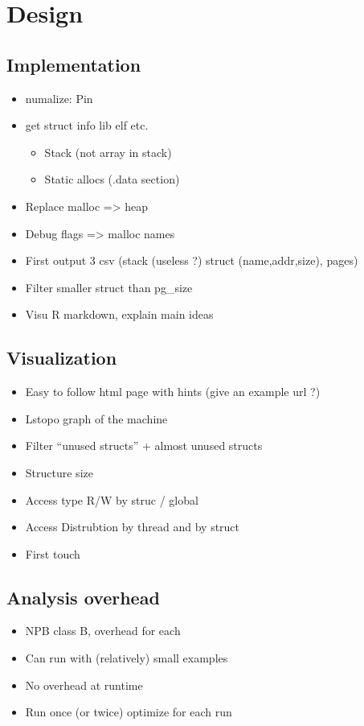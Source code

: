 
\section{Design}
\label{sec:design}
\subsection{Implementation}
\label{sec:design-impl}
\begin{itemize}
    \item numalize: Pin \cite{Luk05Pin}
    \item get struct info lib elf etc.
        \begin{itemize}
            \item Stack (not array in stack)
            \item Static allocs (.data section)
        \end{itemize}
    \item Replace malloc => heap
    \item Debug flags => malloc names
    \item First output 3 csv (stack (useless ?) struct (name,addr,size),
        pages)
    \item Filter smaller struct than pg\_size
    \item Visu R markdown, explain main ideas
\end{itemize}
\subsection{Visualization}
\label{sec:design-visu}

\begin{itemize}
    \item Easy to follow html page with hints (give an example url ?)
    \item Lstopo graph of the machine
    \item Filter ``unused structs'' + almost unused structs
    \item Structure size
    \item Access type R/W by struc / global
    \item Access Distrubtion by thread and by struct
    \item First touch
\end{itemize}

\subsection{Analysis overhead}
\label{sec:expe-overhead}
\begin{itemize}
    \item NPB class B, overhead for each
    \item Can run with (relatively) small  examples
    \item No overhead at runtime
    \item Run once (or twice) optimize for each run
\end{itemize}
